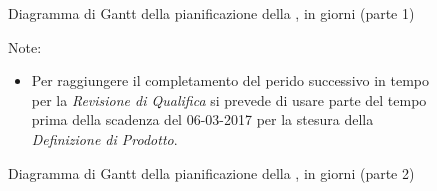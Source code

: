 \begin{figure}[H]
\label{tab:ganttpa1}
\caption{Diagramma di Gantt della pianificazione della \PA, in giorni (parte 1)}
\end{figure}

\begin{figure}[H]
\label{tab:ganttpa2}
\caption{Diagramma di Gantt della pianificazione della \PA, in giorni (parte 2)}

Note:
\begin{itemize}
	\item Per raggiungere il completamento del perido successivo in tempo per la \emph{Revisione di Qualifica} si prevede di usare parte del tempo prima della scadenza del 06-03-2017 per la stesura della \emph{Definizione di Prodotto}.
\end{itemize} 
\end{figure}


